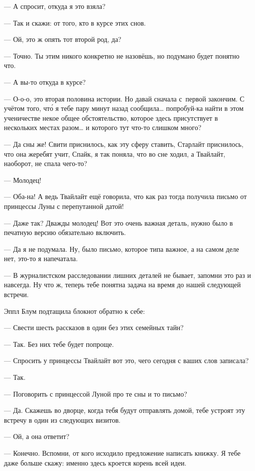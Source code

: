 \documentclass[fontsize=11pt,a5paper,titlepage=firstcover]{scrbook}
\begin{document}
--- А спросит, откуда я это взяла?

--- Так и скажи: от того, кто в курсе этих снов.

--- Ой, это ж опять тот второй род, да?

--- Точно. Ты этим никого конкретно не назовёшь, но подумано будет понятно что.

--- А вы-то откуда в курсе?

--- О-о-о, это вторая половина истории. Но давай сначала с~первой закончим. С учётом того, что́ я тебе пару минут назад сообщила{\ldots} попробуй-ка найти в этом ученичестве некое общее обстоятельство, которое здесь присутствует в нескольких местах разом{\ldots} и которого тут что-то слишком много?

--- Да сны же! Свити приснилось, как эту сферу ставить, Старлайт приснилось, что она жеребят учит, Спайк, я так поняла, что во сне ходил, а Твайлайт, наоборот, не спала чего-то?

--- Молодец!

--- Оба-на! А ведь Твайлайт ещё говорила, что как раз тогда получила письмо от принцессы Луны с перепутанной датой!

--- Даже так? Дважды молодец! Вот это очень важная деталь, нужно было в печатную версию обязательно включить.

--- Да я не подумала. Ну, было письмо, которое типа важное, а на самом деле нет, это-то я напечатала.

--- В журналистском расследовании лишних деталей не бывает, запомни это раз и навсегда. Ну что ж, теперь тебе понятна задача на время до нашей следующей встречи.

Эппл Блум подтащила блокнот обратно к себе:

--- Свести шесть рассказов в один без этих семейных тайн?

--- Так. Без них тебе будет попроще.

--- Спросить у принцессы Твайлайт вот это, чего сегодня с ваших слов записала?

--- Так.

--- Поговорить с принцессой Луной про те сны и то письмо?

--- Да. Скажешь во дворце, когда тебя будут отправлять домой, тебе устроят эту встречу в один из следующих визитов.

--- Ой, а она ответит?

--- Конечно. Вспомни, от кого исходило предложение написать книжку. Я тебе даже больше скажу: именно здесь кроется корень всей идеи.
\end{document}
